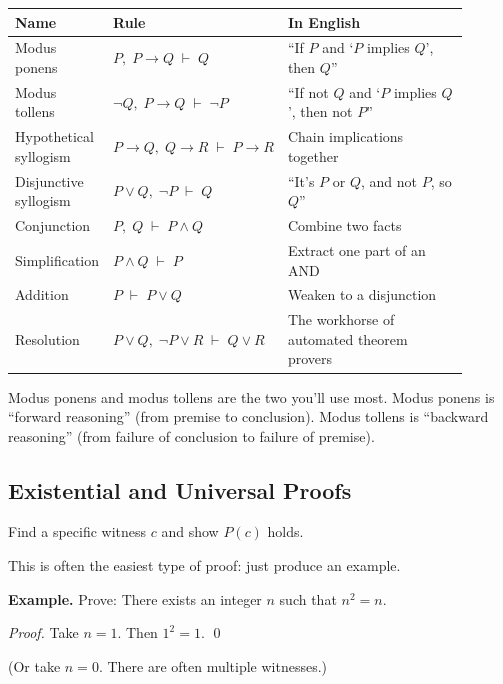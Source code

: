 \begin{center}
{\small
\begin{tabular}{>{\raggedright\arraybackslash}p{0.2\linewidth} >{\raggedright\arraybackslash}p{0.3\linewidth} >{\raggedright\arraybackslash}p{0.4\linewidth}}
\textbf{Name} & \textbf{Rule} & \textbf{In English} \\
\hline
Modus ponens & $P, \; P \to Q \;\vdash\; Q$ & ``If $P$ and `$P$ implies $Q$', then $Q$'' \\
Modus tollens & $\neg Q, \; P \to Q \;\vdash\; \neg P$ & ``If not $Q$ and `$P$ implies $Q$', then not $P$'' \\
Hypothetical syllogism & $P \to Q, \; Q \to R \;\vdash\; P \to R$ & Chain implications together \\
Disjunctive syllogism & $P \lor Q, \; \neg P \;\vdash\; Q$ & ``It's $P$ or $Q$, and not $P$, so $Q$'' \\
Conjunction & $P, \; Q \;\vdash\; P \land Q$ & Combine two facts \\
Simplification & $P \land Q \;\vdash\; P$ & Extract one part of an AND \\
Addition & $P \;\vdash\; P \lor Q$ & Weaken to a disjunction \\
Resolution & $P \lor Q, \; \neg P \lor R \;\vdash\; Q \lor R$ & The workhorse of automated theorem provers \\
\end{tabular}
}
\end{center}

Modus ponens and modus tollens are the two you'll use most. Modus ponens is ``forward reasoning'' (from premise to conclusion). Modus tollens is ``backward reasoning'' (from failure of conclusion to failure of premise).

\subsection*{Existential and Universal Proofs}

\begin{strategy}
Find a specific witness $c$ and show $P(c)$ holds.

This is often the easiest type of proof: just produce an example.

\textbf{Example.} Prove: There exists an integer $n$ such that $n^2 = n$.

\emph{Proof.} Take $n = 1$. Then $1^2 = 1$. \qed

(Or take $n = 0$. There are often multiple witnesses.)
\end{strategy}

